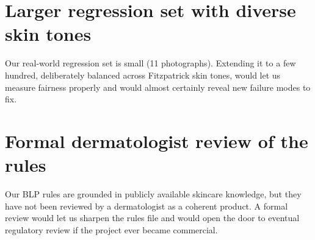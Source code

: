 \documentclass[11pt,a4paper,oneside]{report}
\begin{document}
\section{Larger regression set with diverse skin tones}

Our real-world regression set is small (11 photographs). Extending
it to a few hundred, deliberately balanced across Fitzpatrick
skin tones, would let us measure fairness properly and would
almost certainly reveal new failure modes to fix.

\section{Formal dermatologist review of the rules}

Our BLP rules are grounded in publicly available skincare
knowledge, but they have not been reviewed by a dermatologist as a
coherent product. A formal review would let us sharpen the rules
file and would open the door to eventual regulatory review if the
project ever became commercial.
\end{document}
